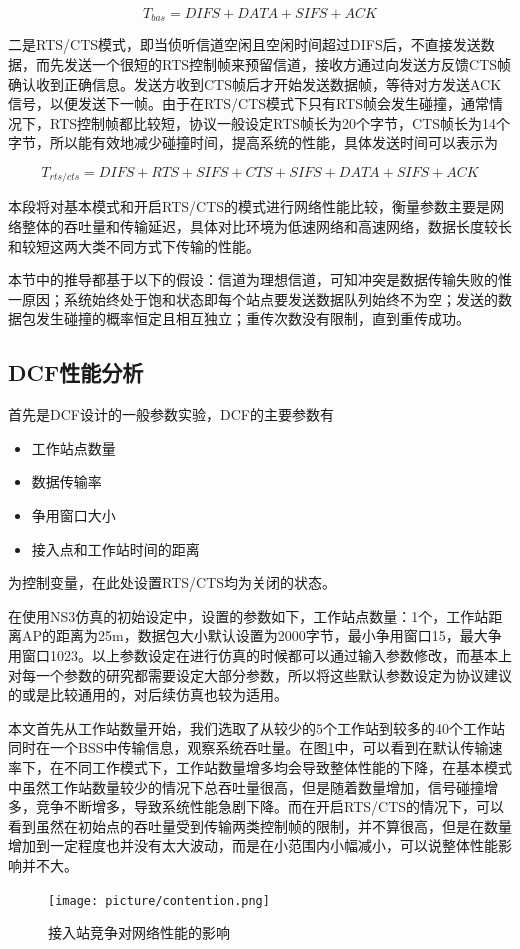 \documentclass{article}
\begin{document}
\begin{equation}
T_{bas} = DIFS + DATA + SIFS + ACK
\end{equation}

二是RTS/CTS模式，即当侦听信道空闲且空闲时间超过DIFS后，不直接发送数据，而先发送一个很短的RTS控制帧来预留信道，接收方通过向发送方反馈CTS帧确认收到正确信息。发送方收到CTS帧后才开始发送数据帧，等待对方发送ACK信号，以便发送下一帧。由于在RTS/CTS模式下只有RTS帧会发生碰撞，通常情况下，RTS控制帧都比较短，协议一般设定RTS帧长为20个字节，CTS帧长为14个字节，所以能有效地减少碰撞时间，提高系统的性能，具体发送时间可以表示为

\begin{equation}
T_{rts/cts} = DIFS + RTS + SIFS + CTS + SIFS + DATA + SIFS + ACK
\end{equation}

本段将对基本模式和开启RTS/CTS的模式进行网络性能比较，衡量参数主要是网络整体的吞吐量和传输延迟，具体对比环境为低速网络和高速网络，数据长度较长和较短这两大类不同方式下传输的性能。

本节中的推导都基于以下的假设：信道为理想信道，可知冲突是数据传输失败的惟一原因；系统始终处于饱和状态即每个站点要发送数据队列始终不为空；发送的数据包发生碰撞的概率恒定且相互独立；重传次数没有限制，直到重传成功。
\subsection{DCF性能分析}

首先是DCF设计的一般参数实验，DCF的主要参数有

\begin{itemize}
	\item {工作站点数量}
	\item {数据传输率}
	\item {争用窗口大小}
	\item {接入点和工作站时间的距离}
\end{itemize}

为控制变量，在此处设置RTS/CTS均为关闭的状态。

在使用NS3仿真的初始设定中，设置的参数如下，工作站点数量：1个，工作站距离AP的距离为25m，数据包大小默认设置为2000字节，最小争用窗口15，最大争用窗口1023。以上参数设定在进行仿真的时候都可以通过输入参数修改，而基本上对每一个参数的研究都需要设定大部分参数，所以将这些默认参数设定为协议建议的或是比较通用的，对后续仿真也较为适用。

本文首先从工作站数量开始，我们选取了从较少的5个工作站到较多的40个工作站同时在一个BSS中传输信息，观察系统吞吐量。在图\ref{fig:contention}中，可以看到在默认传输速率下，在不同工作模式下，工作站数量增多均会导致整体性能的下降，在基本模式中虽然工作站数量较少的情况下总吞吐量很高，但是随着数量增加，信号碰撞增多，竞争不断增多，导致系统性能急剧下降。而在开启RTS/CTS的情况下，可以看到虽然在初始点的吞吐量受到传输两类控制帧的限制，并不算很高，但是在数量增加到一定程度也并没有太大波动，而是在小范围内小幅减小，可以说整体性能影响并不大。
\begin{figure}[ht]
	\centering
	\texttt{[image: picture/contention.png]}
	\caption{接入站竞争对网络性能的影响}
	\label{fig:contention}
\end{figure}
\end{document}
